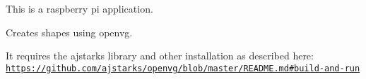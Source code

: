 This is a raspberry pi application.

Creates shapes using openvg.

It requires the ajstarks library and other installation as described here\+: \href{https://github.com/ajstarks/openvg/blob/master/README.md#build-and-run}{\tt https\+://github.\+com/ajstarks/openvg/blob/master/\+R\+E\+A\+D\+M\+E.\+md\#build-\/and-\/run} 